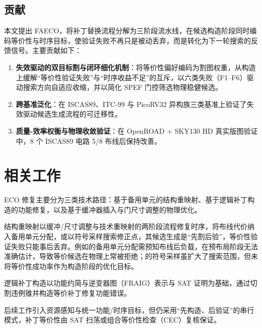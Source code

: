 \documentclass[journal]{IEEEtran}
\begin{document}
\subsection{贡献}

本文提出 FAECO，将补丁替换流程分解为三阶段流水线，在候选构造阶段同时编码等价性与时序目标，使验证失败不再只是被动丢弃，而是转化为下一轮搜索的反馈信号。主要贡献如下：

\begin{enumerate}
  \item \textbf{失效驱动的双目标割与闭环细化机制}：将等价性偏好编码为割图权重，从构造上缓解“等价性验证失败”与“时序收益不足”的互斥，以六类失败（F1--F6）驱动搜索方向自适应收缩，并以简化 SPEF 门控筛选物理稳健候选。
  \item \textbf{跨基准泛化}：在 ISCAS89、ITC-99 与 PicoRV32 异构族三类基准上验证了失效驱动候选生成流程的可迁移性。
  \item \textbf{质量-效率权衡与物理收敛验证}：在 OpenROAD + SKY130 HD 真实版图验证中，8 个 ISCAS89 电路 5/8 布线后保持改善。
\end{enumerate}

\section{相关工作}

ECO 修复主要分为三类技术路径：基于备用单元的结构重映射、基于逻辑补丁构造的功能修复，以及基于缓冲器插入与门尺寸调整的物理优化。

结构重映射以缓冲/尺寸调整与技术重映射的两阶段流程修复时序，将布线代价纳入备用单元分配\cite{ho2010eco,ho2012treco}，或以符号采样搜索修正点\cite{kravets2019symbolic}，其候选生成是“先割后验”，等价性验证失败只能事后丢弃。例如\cite{ho2010eco}的备用单元分配需预知布线后负载，在预布局阶段无法准确估计，导致等价候选在物理上常被拒绝；\cite{kravets2019symbolic}的符号采样虽扩大了搜索范围，但未将等价性成功率作为构造阶段的优化目标。

逻辑补丁构造以功能约简与逆变器图（FRAIG）表示与 SAT 证明为基础，通过切割违例锥并构造等价补丁修复功能错误\cite{jiang2010fraig,jiang2016resource}。

后续工作引入资源感知\cite{jiang2016resource}与统一功能/时序目标\cite{lin2011simult,luo2016unified}，但仍采用“先构造、后验证”的串行模式，补丁等价性由 SAT 扫荡或组合等价性检查（CEC）复核保证\cite{mishchenko2006sat,zhong2024stp}。
\end{document}
